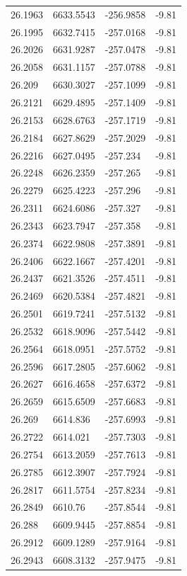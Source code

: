 \begin{table}[H]
\begin{tabular}{llll}
26.1963 & 6633.5543 & -256.9858 & -9.81 \\
26.1995 & 6632.7415 & -257.0168 & -9.81 \\
26.2026 & 6631.9287 & -257.0478 & -9.81 \\
26.2058 & 6631.1157 & -257.0788 & -9.81 \\
26.209 & 6630.3027 & -257.1099 & -9.81 \\
26.2121 & 6629.4895 & -257.1409 & -9.81 \\
26.2153 & 6628.6763 & -257.1719 & -9.81 \\
26.2184 & 6627.8629 & -257.2029 & -9.81 \\
26.2216 & 6627.0495 & -257.234 & -9.81 \\
26.2248 & 6626.2359 & -257.265 & -9.81 \\
26.2279 & 6625.4223 & -257.296 & -9.81 \\
26.2311 & 6624.6086 & -257.327 & -9.81 \\
26.2343 & 6623.7947 & -257.358 & -9.81 \\
26.2374 & 6622.9808 & -257.3891 & -9.81 \\
26.2406 & 6622.1667 & -257.4201 & -9.81 \\
26.2437 & 6621.3526 & -257.4511 & -9.81 \\
26.2469 & 6620.5384 & -257.4821 & -9.81 \\
26.2501 & 6619.7241 & -257.5132 & -9.81 \\
26.2532 & 6618.9096 & -257.5442 & -9.81 \\
26.2564 & 6618.0951 & -257.5752 & -9.81 \\
26.2596 & 6617.2805 & -257.6062 & -9.81 \\
26.2627 & 6616.4658 & -257.6372 & -9.81 \\
26.2659 & 6615.6509 & -257.6683 & -9.81 \\
26.269 & 6614.836 & -257.6993 & -9.81 \\
26.2722 & 6614.021 & -257.7303 & -9.81 \\
26.2754 & 6613.2059 & -257.7613 & -9.81 \\
26.2785 & 6612.3907 & -257.7924 & -9.81 \\
26.2817 & 6611.5754 & -257.8234 & -9.81 \\
26.2849 & 6610.76 & -257.8544 & -9.81 \\
26.288 & 6609.9445 & -257.8854 & -9.81 \\
26.2912 & 6609.1289 & -257.9164 & -9.81 \\
26.2943 & 6608.3132 & -257.9475 & -9.81 \\

\end{tabular}
\end{table}
